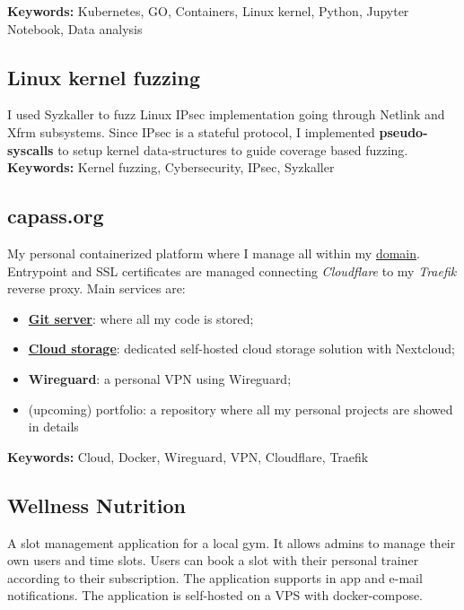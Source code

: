 \documentclass[11pt,a4paper]{article}
\begin{document}
  \textbf{Keywords:} Kubernetes, GO, Containers, Linux kernel, Python, Jupyter Notebook, Data analysis

  \subsection{Linux kernel fuzzing \href{https://github.com/alarmfox/progetto-software-security}{\faGithub}}
  I used Syzkaller to fuzz Linux IPsec implementation going through Netlink and Xfrm subsystems. Since IPsec is a 
  stateful protocol, I implemented \textbf{pseudo-syscalls} to setup kernel data-structures to guide coverage based 
  fuzzing. \\

  \textbf{Keywords:} Kernel fuzzing, Cybersecurity, IPsec, Syzkaller 

  \subsection{capass.org \href{https://github.com/alarmfox/personal-cloud}{\faGithub} \href{https://git.capass.org}{\faGit} \href{https://cloud.capass.org}{\faCloud}}
  My personal containerized platform where I manage all within my \href{https://capass.org}{domain}. Entrypoint and SSL certificates are managed connecting \textit{Cloudflare} to my \textit{Traefik} reverse proxy. Main services are:
  \begin{itemize}
    \item \href{https://git.capass.org}{\textbf{Git server}}: where all my code is stored;
    \item \href{https://cloud.capass.org}{\textbf{Cloud storage}}: dedicated self-hosted cloud storage solution with Nextcloud;
    \item \textbf{Wireguard}: a personal VPN using Wireguard;
    \item (upcoming) portfolio: a repository where all my personal projects are showed in details
  \end{itemize}

  \textbf{Keywords:} Cloud, Docker, Wireguard, VPN, Cloudflare, Traefik

  \subsection{Wellness Nutrition \href{https://github.com/alarmfox/wellness-nutrition}{\faGithub} \href{https://wellnessdemo.capass.org}{\faLaptopCode}}
  A slot management application for a local gym. It allows admins to manage their own users and time slots. Users can book a slot with their personal trainer according to their subscription. The application supports in app and e-mail notifications. The application is self-hosted on a VPS with docker-compose.\\
\end{document}
